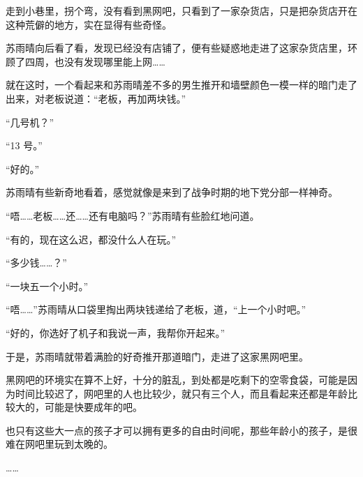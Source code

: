 走到小巷里，拐个弯，没有看到黑网吧，只看到了一家杂货店，只是把杂货店开在这种荒僻的地方，实在显得有些奇怪。

苏雨晴向后看了看，发现已经没有店铺了，便有些疑惑地走进了这家杂货店里，环顾了四周，也没有发现哪里能上网……

就在这时，一个看起来和苏雨晴差不多的男生推开和墙壁颜色一模一样的暗门走了出来，对老板说道：“老板，再加两块钱。”

“几号机？”

“13 号。”

“好的。”

苏雨晴有些新奇地看着，感觉就像是来到了战争时期的地下党分部一样神奇。

“唔……老板……还……还有电脑吗？”苏雨晴有些脸红地问道。

“有的，现在这么迟，都没什么人在玩。”

“多少钱……？”

“一块五一个小时。”

“唔……”苏雨晴从口袋里掏出两块钱递给了老板，道，“上一个小时吧。”

“好的，你选好了机子和我说一声，我帮你开起来。”

于是，苏雨晴就带着满脸的好奇推开那道暗门，走进了这家黑网吧里。

黑网吧的环境实在算不上好，十分的脏乱，到处都是吃剩下的空零食袋，可能是因为时间比较迟了，网吧里的人也比较少，就只有三个人，而且看起来还都是年龄比较大的，可能是快要成年的吧。

也只有这些大一点的孩子才可以拥有更多的自由时间呢，那些年龄小的孩子，是很难在网吧里玩到太晚的。

……
